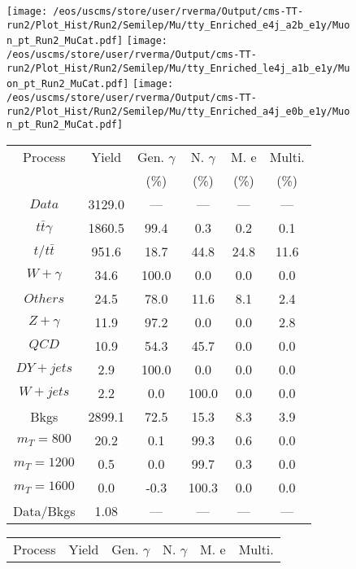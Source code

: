 \begin{figure}
\centering
\texttt{[image: /eos/uscms/store/user/rverma/Output/cms-TT-run2/Plot\_Hist/Run2/Semilep/Mu/tty\_Enriched\_e4j\_a2b\_e1y/Muon\_pt\_Run2\_MuCat.pdf]}
\texttt{[image: /eos/uscms/store/user/rverma/Output/cms-TT-run2/Plot\_Hist/Run2/Semilep/Mu/tty\_Enriched\_le4j\_a1b\_e1y/Muon\_pt\_Run2\_MuCat.pdf]}
\texttt{[image: /eos/uscms/store/user/rverma/Output/cms-TT-run2/Plot\_Hist/Run2/Semilep/Mu/tty\_Enriched\_a4j\_e0b\_e1y/Muon\_pt\_Run2\_MuCat.pdf]}
\begin{minipage}[c]{0.32\textwidth}
\centering
\tiny{
\begin{tabular}{cccccc}
\hline
Process & Yield & Gen. $\gamma$ & N. $\gamma$ & M. e & Multi. \\
 &  & (\%) & (\%) & (\%) & (\%)  \\
\hline
                                                                      $ Data $ &  3129.0 &  --- &  --- &  --- &  ---\\
$ t\bar{t}\gamma $ &  1860.5 &  99.4 &  0.3 &  0.2 &  0.1\\
$ t/t\bar{t} $ &  951.6 &  18.7 &  44.8 &  24.8 &  11.6\\
$ W+\gamma $ &  34.6 &  100.0 &  0.0 &  0.0 &  0.0\\
$ Others $ &  24.5 &  78.0 &  11.6 &  8.1 &  2.4\\
$ Z+\gamma $ &  11.9 &  97.2 &  0.0 &  0.0 &  2.8\\
$ QCD $ &  10.9 &  54.3 &  45.7 &  0.0 &  0.0\\
$ DY+jets $ &  2.9 &  100.0 &  0.0 &  0.0 &  0.0\\
$ W+jets $ &  2.2 &  0.0 &  100.0 &  0.0 &  0.0\\
Bkgs &  2899.1 &  72.5 &  15.3 &  8.3 &  3.9\\
$ m_{T} = 800 $ &  20.2 &  0.1 &  99.3 &  0.6 &  0.0\\
$ m_{T} = 1200 $ &  0.5 &  0.0 &  99.7 &  0.3 &  0.0\\
$ m_{T} = 1600 $ &  0.0 &  -0.3 &  100.3 &  0.0 &  0.0\\
Data/Bkgs &  1.08 &  --- &  --- &  --- &  ---\\
\hline
\end{tabular}
}
\end{minipage}
\begin{minipage}[c]{0.32\textwidth}
\centering
\tiny{
\begin{tabular}{cccccc}
\hline
Process & Yield & Gen. $\gamma$ & N. $\gamma$ & M. e & Multi. \\

\end{tabular}}
\end{minipage}
\end{figure}
